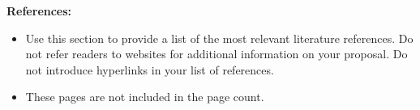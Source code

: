\documentclass[12pt,oneside]{article}
\newenvironment{smitemize}{
\begin{itemize}
  \setlength{\itemsep}{1pt}
  \setlength{\parskip}{0pt}
  \setlength{\parsep}{0pt}}
{\end{itemize}
}
\begin{document}
\clearpage
\setcounter{page}{1}
{\bf References:}
\begin{smitemize}
\item Use this section to provide a list of the most relevant literature references. Do not refer readers to websites for additional information on your proposal. Do not introduce hyperlinks in your list of references.
\item These pages are not included in the page count.
\end{smitemize}

{\def\section*#1{}
}
\end{document}
